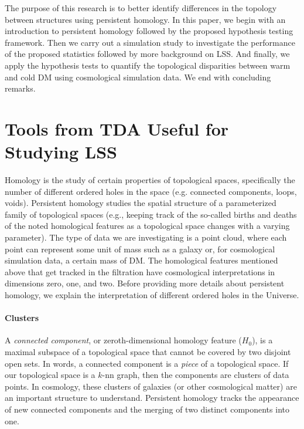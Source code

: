\documentclass[12pt]{article}
\begin{document}
The purpose of this research is to better identify differences in the topology between structures using persistent homology. In this paper, we begin with an introduction to persistent homology followed by the proposed hypothesis testing framework. Then we carry out a simulation study to investigate the performance of the proposed statistics followed by more background on LSS. And finally, we apply the hypothesis tests to quantify the topological disparities between warm and cold DM using cosmological simulation data. We end with concluding remarks.



\section{Tools from TDA Useful for Studying LSS}
\label{sec:tda}
Homology is the study of certain properties of topological spaces, specifically the number of different ordered holes in the space (e.g. connected components, loops, voids). Persistent homology studies the spatial structure of a parameterized family of topological spaces (e.g., keeping track of the so-called
births and deaths of the noted homological features as a topological space changes with a varying parameter).
%
The type of data we are investigating is a point cloud, where each point can represent some unit of mass such as a galaxy or, for cosmological simulation data, a certain mass of DM.
The homological features mentioned above that get tracked in the filtration have cosmological interpretations in dimensions zero, one, and two.  Before providing more details about persistent homology, we explain the interpretation of different ordered holes in the Universe.

\paragraph{Clusters}
A \emph{connected component}, or zeroth-dimensional homology feature ($H_0$), is a maximal subspace of a topological space that cannot be covered by two disjoint open sets. In words, a connected component is a \textit{piece} of a topological space.  If our topological space is a $k$-nn graph, then the components are clusters of data points. In cosmology, these clusters of galaxies (or other cosmological matter) are an important structure to understand. Persistent homology tracks the appearance of new connected components and the merging of two distinct components into one.
\end{document}
